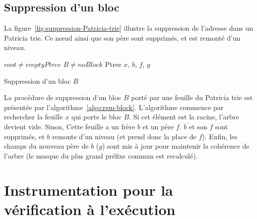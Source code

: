 \subsection{Suppression d'un bloc}


La figure~\ref{fig:suppression-Patricia-trie} illustre la suppression de
l'adresse  dans un Patricia trie.
Ce n\oe{}ud ainsi que son père  sont supprimés, et
 est remonté d'un niveau.




\begin{algorithm}[h!]
\begin{algorithmic}[1]
\Require $root \neq emptyPtree$
\Require $B \neq noBlock$
\Statex
{}
\Statex Ptree $x$, $b$, $f$, $g$
  \Else
  \EndIf
\EndWhile
{}
\Else
  \EndIf
  \EndIf
\EndIf
\EndProcedure
\end{algorithmic}
\caption{Suppression d'un bloc $B$
  \label{algo:rem-block}}
\end{algorithm}

La procédure de suppression d'un bloc $B$ porté par une feuille du Patricia trie
est présentée par l'algorithme~\ref{algo:rem-block}.
L'algorithme commence par rechercher la feuille $x$ qui porte le bloc $B$.
Si cet élément est la racine, l'arbre devient vide.
Sinon, Cette feuille a un frère $b$ et un père $f$.
$b$ et son $f$ sont supprimés, et $b$ remonte d'un niveau (et prend donc la
place de $f$).
Enfin, les champs du nouveau père de $b$ ($g$) sont mis à jour pour
maintenir la cohérence de l'arbre (le masque du plus grand préfixe commun est
recalculé).


\section{Instrumentation pour la vérification à l'exécution}
\label{sec:mem-instru}


